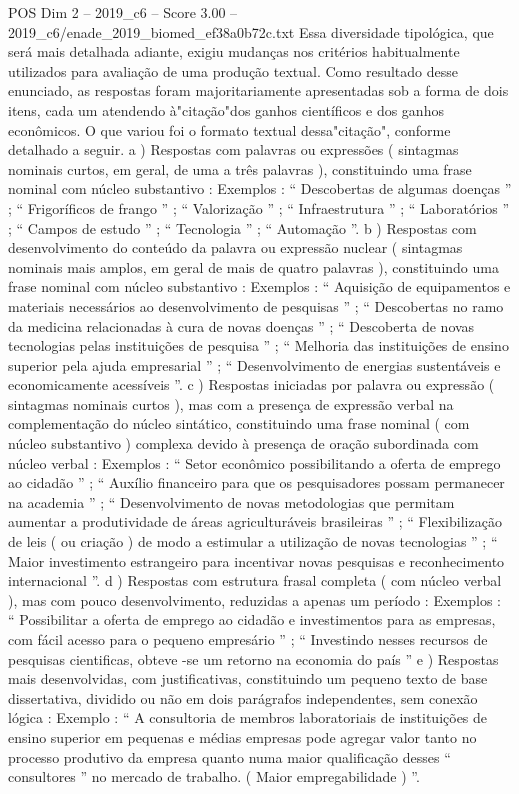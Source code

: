 \begin{textsample}{POS Dim 2 – 2019\_c6 – Score 3.00 – 2019\_c6/enade\_2019\_biomed\_ef38a0b72c.txt}
Essa diversidade tipológica, que será mais detalhada adiante, exigiu mudanças nos critérios habitualmente utilizados para avaliação de uma produção textual.
Como resultado desse enunciado, as respostas foram majoritariamente apresentadas sob a forma de dois itens, cada um atendendo à"citação"dos ganhos científicos e dos ganhos econômicos.
O que variou foi o formato textual dessa"citação", conforme detalhado a seguir. a ) Respostas com palavras ou expressões ( sintagmas nominais curtos, em geral, de uma a três palavras ), constituindo uma frase nominal com núcleo substantivo : Exemplos : “ Descobertas de algumas doenças ” ; “ Frigoríficos de frango ” ; “ Valorização ” ; “ Infraestrutura ” ; “ Laboratórios ” ; “ Campos de estudo ” ; “ Tecnologia ” ; “ Automação ”. b ) Respostas com desenvolvimento do conteúdo da palavra ou expressão nuclear ( sintagmas nominais mais amplos, em geral de mais de quatro palavras ), constituindo uma frase nominal com núcleo substantivo : Exemplos : “ Aquisição de equipamentos e materiais necessários ao desenvolvimento de pesquisas ” ; “ Descobertas no ramo da medicina relacionadas à cura de novas doenças ” ; “ Descoberta de novas tecnologias pelas instituições de pesquisa ” ; “ Melhoria das instituições de ensino superior pela ajuda empresarial ” ; “ Desenvolvimento de energias sustentáveis e economicamente acessíveis ”. c ) Respostas iniciadas por palavra ou expressão ( sintagmas nominais curtos ), mas com a presença de expressão verbal na complementação do núcleo sintático, constituindo uma frase nominal ( com núcleo substantivo ) complexa devido à presença de oração subordinada com núcleo verbal : Exemplos : “ Setor econômico possibilitando a oferta de emprego ao cidadão ” ; “ Auxílio financeiro para que os pesquisadores possam permanecer na academia ” ; “ Desenvolvimento de novas metodologias que permitam aumentar a produtividade de áreas agriculturáveis brasileiras ” ; “ Flexibilização de leis ( ou criação ) de modo a estimular a utilização de novas tecnologias ” ; “ Maior investimento estrangeiro para incentivar novas pesquisas e reconhecimento internacional ”. d ) Respostas com estrutura frasal completa ( com núcleo verbal ), mas com pouco desenvolvimento, reduzidas a apenas um período : Exemplos : “ Possibilitar a oferta de emprego ao cidadão e investimentos para as empresas, com fácil acesso para o pequeno empresário ” ; “ Investindo nesses recursos de pesquisas cientificas, obteve -se um retorno na economia do país ” e ) Respostas mais desenvolvidas, com justificativas, constituindo um pequeno texto de base dissertativa, dividido ou não em dois parágrafos independentes, sem conexão lógica : Exemplo : “ A consultoria de membros laboratoriais de instituições de ensino superior em pequenas e médias empresas pode agregar valor tanto no processo produtivo da empresa quanto numa maior qualificação desses “ consultores ” no mercado de trabalho. ( Maior empregabilidade ) ”.

\end{textsample}
